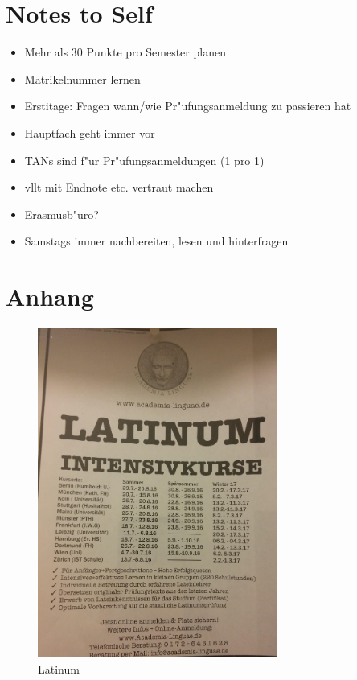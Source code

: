 \documentclass[]{scrartcl}
\begin{document}
\section{Notes to Self}

\begin{itemize}
    \item Mehr als 30 Punkte pro Semester planen
    \item Matrikelnummer lernen
    \item Erstitage: Fragen wann/wie Pr"ufungsanmeldung zu passieren hat
    \item Hauptfach geht immer vor
    \item TANs sind f"ur Pr"ufungsanmeldungen (1 pro 1)
    \item vllt mit Endnote etc. vertraut machen
    \item Erasmusb"uro?
    \item Samstags immer nachbereiten, lesen und hinterfragen

  \end{itemize}
\newpage
\section{Anhang}

\begin{figure}[h]
	\centering
	\includegraphics[width=0.7\textwidth]{images/studienorga/latin.jpg}
	\caption{Latinum}
	\label{fig:sts}
\end{figure}
\end{document}
